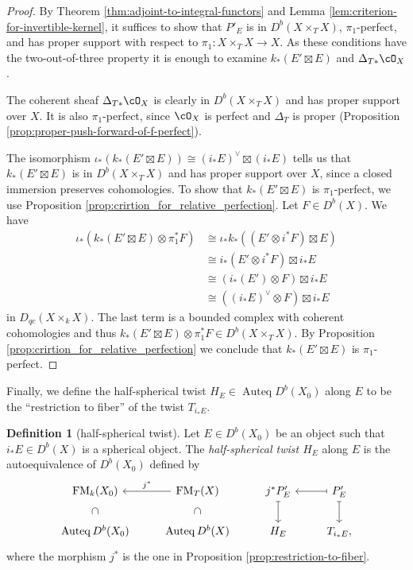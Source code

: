 \documentclass{amsart}
\numberwithin{equation}{section}
\theoremstyle{plain}
\theoremstyle{definition}
\newtheorem{definition}[theorem]{Definition}
\DeclareMathOperator{\Auteq}{\mathrm{Auteq}}
\DeclareMathOperator{\FM}{\mathrm{FM}}
\begin{document}
\begin{proof}
    By Theorem \ref{thm:adjoint-to-integral-functors} and Lemma \ref{lem:criterion-for-invertible-kernel}, it suffices to show that $P'_E$ is in $D^b(X \times_T X)$, $\pi_1$-perfect, and has proper support with respect to $\pi_1 \colon X \times_T X \to X$.
    As these conditions have the two-out-of-three property it is enough to examine $k_*(E' \boxtimes E)$ and $\Delta_{T*}\cO_X$.

    The coherent sheaf $\Delta_{T*}\cO_X$ is clearly in $D^b(X \times_T X)$ and has proper support over $X$.
    It is also $\pi_1$-perfect, since $\cO_X$ is perfect and $\Delta_{T}$ is proper (Proposition \ref{prop:proper-push-forward-of-f-perfect}).

    The isomorphism $\iota_*(k_*(E' \boxtimes E)) \cong (i_*E)^\vee\boxtimes (i_*E)$ tells us that $k_*(E' \boxtimes E)$ is in $D^b(X \times_T X)$ and has proper support over $X$, since a closed immersion preserves cohomologies.
    To show that $k_*(E' \boxtimes E)$ is $\pi_1$-perfect, we use Proposition \ref{prop:crirtion_for_relative_perfection}.
    Let $F \in D^b(X)$.
    We have
    \begin{align}
        \iota_*(k_*(E' \boxtimes E) \otimes \pi_1^*F) & \cong \iota_*k_*((E' \otimes i^*F) \boxtimes E) \\
                                                      & \cong i_*(E' \otimes i^*F) \boxtimes i_*E       \\
                                                      & \cong (i_*(E') \otimes F) \boxtimes i_*E        \\
                                                      & \cong ((i_*E)^\vee \otimes F) \boxtimes i_*E
    \end{align}
    in $D_{qc}(X \times_k X)$.
    The last term is a bounded complex with coherent cohomologies and thus $k_*(E' \boxtimes E) \otimes \pi_1^*F \in D^b(X \times_T X)$.
    By Proposition \ref{prop:crirtion_for_relative_perfection} we conclude that $k_*(E' \boxtimes E)$ is $\pi_1$-perfect.
\end{proof}
Finally, we define the half-spherical twist $H_E \in \Auteq D^b(X_0)$ along $E$ to be the ``restriction to fiber'' of the twist $T_{i_*E}$.
\begin{definition}[half-spherical twist]\label{def:half-spherical-twist}
    Let $E \in D^b(X_0)$ be an object such that $i_*E \in D^b(X)$ is a spherical object.
    The \emph{half-spherical twist $H_E$} along $E$ is the autoequivalence of $D^b(X_0)$ defined by
    \[
        \begin{tikzcd}
            \FM_k(X_0) \ar[d, phantom, sloped, "\subset"] & \FM_T(X)\ar[l, "j^*"']\ar[d, phantom, sloped, "\subset"] & j^*P'_E \ar[d, mapsto]& P'_E \ar[l, mapsto] \ar[d, mapsto]\\
            \Auteq D^b(X_0) & \Auteq D^b(X) & H_E & T_{i_*E},
        \end{tikzcd}
    \]
    where the morphism $j^*$ is the one in Proposition \ref{prop:restriction-to-fiber}.
\end{definition}
\end{document}
